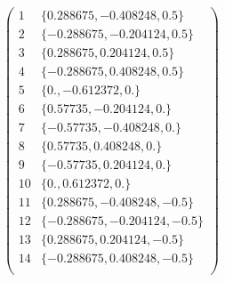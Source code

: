 \documentclass{article}
\begin{document}
\begin{doublespace}
\noindent\(\left(
\begin{array}{cc}
 1 & \{0.288675,-0.408248,0.5\} \\
 2 & \{-0.288675,-0.204124,0.5\} \\
 3 & \{0.288675,0.204124,0.5\} \\
 4 & \{-0.288675,0.408248,0.5\} \\
 5 & \{0.,-0.612372,0.\} \\
 6 & \{0.57735,-0.204124,0.\} \\
 7 & \{-0.57735,-0.408248,0.\} \\
 8 & \{0.57735,0.408248,0.\} \\
 9 & \{-0.57735,0.204124,0.\} \\
 10 & \{0.,0.612372,0.\} \\
 11 & \{0.288675,-0.408248,-0.5\} \\
 12 & \{-0.288675,-0.204124,-0.5\} \\
 13 & \{0.288675,0.204124,-0.5\} \\
 14 & \{-0.288675,0.408248,-0.5\} \\
\end{array}
\right)\)
\end{doublespace}
\end{document}
